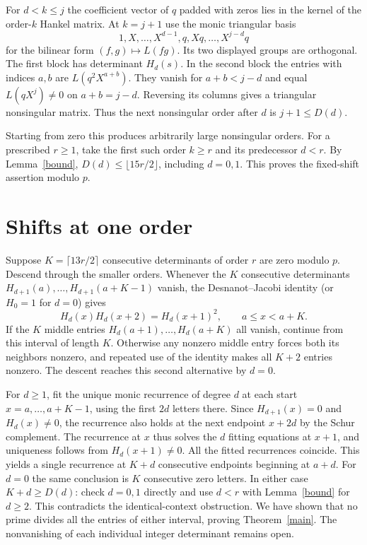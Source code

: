 \documentclass[11pt]{article}
\begin{document}
For $d<k\le j$ the coefficient vector of $q$ padded with zeros lies in the kernel of the order-$k$ Hankel matrix. At $k=j+1$ use the monic triangular basis
\[
 1,X,\ldots,X^{d-1},q,Xq,\ldots,X^{j-d}q
\]
for the bilinear form $(f,g)\mapsto L(fg)$. Its two displayed groups are orthogonal. The first block has determinant $H_d(s)$. In the second block the entries with indices $a,b$ are $L(q^2X^{a+b})$. They vanish for $a+b<j-d$ and equal $L(qX^j)\ne0$ on $a+b=j-d$. Reversing its columns gives a triangular nonsingular matrix. Thus the next nonsingular order after $d$ is $j+1\le D(d)$.

Starting from zero this produces arbitrarily large nonsingular orders. For a prescribed $r\ge1$, take the first such order $k\ge r$ and its predecessor $d<r$. By Lemma~\ref{bound}, $D(d)\le\lfloor15r/2\rfloor$, including $d=0,1$. This proves the fixed-shift assertion modulo $p$.

\section{Shifts at one order}
Suppose $K=\lceil13r/2\rceil$ consecutive determinants of order $r$ are zero modulo $p$. Descend through the smaller orders. Whenever the $K$ consecutive determinants $H_{d+1}(a),\ldots,H_{d+1}(a+K-1)$ vanish, the Desnanot--Jacobi identity (or $H_0=1$ for $d=0$) gives
\[
 H_d(x)H_d(x+2)=H_d(x+1)^2,\qquad a\le x<a+K.
\]
If the $K$ middle entries $H_d(a+1),\ldots,H_d(a+K)$ all vanish, continue from this interval of length $K$. Otherwise any nonzero middle entry forces both its neighbors nonzero, and repeated use of the identity makes all $K+2$ entries nonzero. The descent reaches this second alternative by $d=0$.

For $d\ge1$, fit the unique monic recurrence of degree $d$ at each start $x=a,\ldots,a+K-1$, using the first $2d$ letters there. Since $H_{d+1}(x)=0$ and $H_d(x)\ne0$, the recurrence also holds at the next endpoint $x+2d$ by the Schur complement. The recurrence at $x$ thus solves the $d$ fitting equations at $x+1$, and uniqueness follows from $H_d(x+1)\ne0$. All the fitted recurrences coincide. This yields a single recurrence at $K+d$ consecutive endpoints beginning at $a+d$. For $d=0$ the same conclusion is $K$ consecutive zero letters. In either case $K+d\ge D(d)$: check $d=0,1$ directly and use $d<r$ with Lemma~\ref{bound} for $d\ge2$. This contradicts the identical-context obstruction. We have shown that no prime divides all the entries of either interval, proving Theorem~\ref{main}. The nonvanishing of each individual integer determinant remains open.
\end{document}
